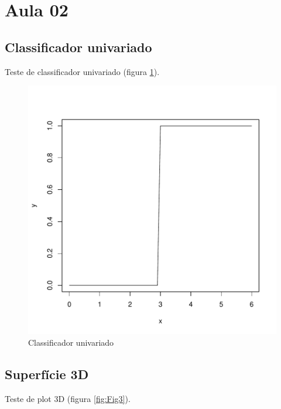 \documentclass{article}
\begin{document}


\section{Aula 02}


\subsection{Classificador univariado}
Teste de classificador univariado (figura \ref{fig:Fig1}).

\begin{figure}[h]
\centering
\includegraphics{1703-001}
\caption{Classificador univariado}
\label{fig:Fig1}
\end{figure}


\subsection{Superfície 3D}
Teste de plot 3D (figura \ref{fig:Fig3}).
\end{document}

